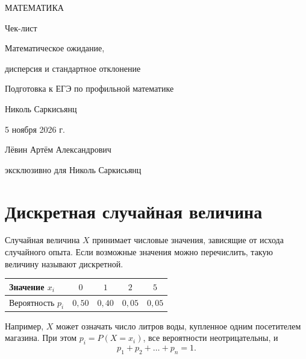 \documentclass[a4paper,12pt]{article}
\newcommand{\key}[1]{\textcolor{darkaccent}{#1}}
\begin{document}
\hypersetup{pageanchor=false}
\begin{titlepage}
\thispagestyle{empty}
\begin{center}
\vspace*{24mm}
{\Large\color{darkaccent} МАТЕМАТИКА\par}
\vspace{12mm}
{\LARGE Чек-лист\par}
\vspace{12mm}
{\LARGE\color{accent} Математическое ожидание,\par}
{\LARGE\color{accent} дисперсия и стандартное отклонение\par}
\vspace{17mm}
{\normalsize Подготовка к ЕГЭ по профильной математике\par}
\vfill
{\large Николь Саркисьянц\par}
\vspace{10mm}
{5 ноября 2026 г.\par}
\vspace{13mm}
{\small Лёвин Артём Александрович\par}
{\small эксклюзивно для Николь Саркисьянц\par}
\vspace{4mm}
\vspace{2mm}
\end{center}
\end{titlepage}
\hypersetup{pageanchor=true}

\section{Дискретная случайная величина}
Случайная величина $X$ принимает числовые значения, зависящие от исхода случайного опыта. Если возможные значения можно перечислить, такую величину называют \key{дискретной}.

\begin{center}
\renewcommand{\arraystretch}{1.35}
\begin{tabular}{@{}lcccc@{}}
\toprule
Значение $x_i$ & $0$ & $1$ & $2$ & $5$ \\
\midrule
Вероятность $p_i$ & $0{,}50$ & $0{,}40$ & $0{,}05$ & $0{,}05$ \\
\bottomrule
\end{tabular}
\end{center}
Например, $X$ может означать число литров воды, купленное одним посетителем магазина. При этом $p_i=P(X=x_i)$, все вероятности неотрицательны, и
\[
\boxed{p_1+p_2+\ldots+p_n=1.}
\]
\end{document}
